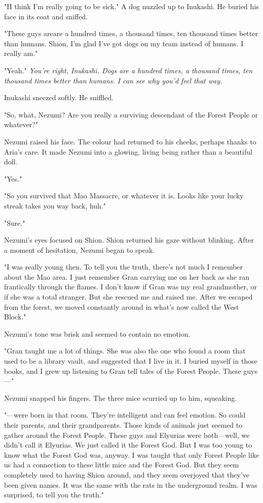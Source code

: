 "I\el I think I'm really going to be sick." A dog nuzzled up to
Inukashi. He buried his face in its coat and sniffed.

"These guys are\el are a hundred times, a thousand times, ten thousand
times better than humans. Shion, I'm glad I've got dogs on my team
instead of humans. I really am."

"Yeah." \emph{You're right, Inukashi. Dogs are a hundred times, a thousand
times, ten thousand times better than humans. I can see why you'd feel
that way.}

Inukashi sneezed softly. He sniffled.

"So, what, Nezumi? Are you really a surviving descendant of the Forest
People or whatever?"

Nezumi raised his face. The colour had returned to his cheeks, perhaps
thanks to Aria's care. It made Nezumi into a glowing, living being
rather than a beautiful doll.

"Yes."

"So you survived that Mao Massacre, or whatever it is. Looks like your
lucky streak takes you way back, huh."

"Sure."

Nezumi's eyes focused on Shion. Shion returned his gaze without
blinking. After a moment of hesitation, Nezumi began to speak.

"I was really young then. To tell you the truth, there's not much I
remember about the Mao area. I just remember Gran carrying me on her
back as she ran frantically through the flames. I don't know if Gran was
my real grandmother, or if she was a total stranger. But she rescued me
and raised me. After we escaped from the forest, we moved constantly
around in what's now called the West Block."

Nezumi's tone was brisk and seemed to contain no emotion.

"Gran taught me a lot of things. She was also the one who found a room
that used to be a library vault, and suggested that I live in it. I
buried myself in those books, and I grew up listening to Gran tell tales
of the Forest People. These guys---"

Nezumi snapped his fingers. The three mice scurried up to him,
squeaking.

"---were born in that room. They're intelligent and can feel emotion. So
could their parents, and their grandparents. Those kinds of animals just
seemed to gather around the Forest People. These guys and Elyurias were
both---well, we didn't call it Elyurias. We just called it the Forest God.
But I was too young to know what the Forest God was, anyway. I was
taught that only Forest People like us had a connection to these little
mice and the Forest God. But they seem completely used to having Shion
around, and they seem overjoyed that they've been given names. It was
the same with the rats in the underground realm. I was surprised, to
tell you the truth."

